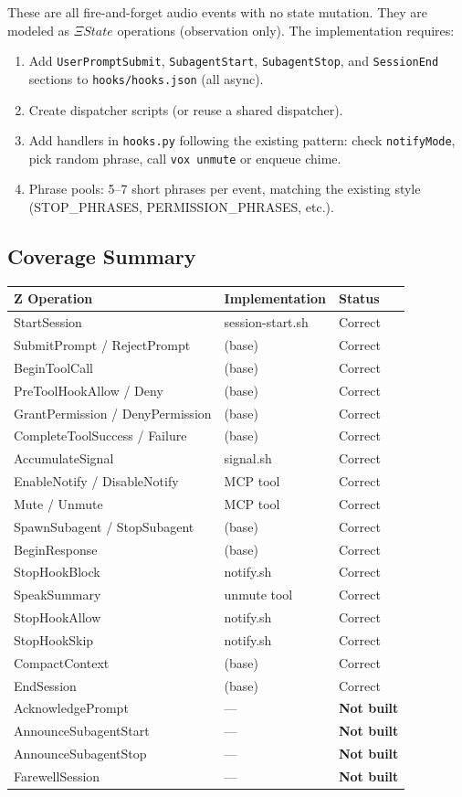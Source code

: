 \documentclass[a4paper,10pt,fleqn]{article}
\begin{document}
These are all fire-and-forget audio events with no state mutation.
They are modeled as $\Xi State$ operations (observation only). The
implementation requires:

\begin{enumerate}
  \item Add \texttt{UserPromptSubmit}, \texttt{SubagentStart},
    \texttt{SubagentStop}, and \texttt{SessionEnd} sections to
    \texttt{hooks/hooks.json} (all async).
  \item Create dispatcher scripts (or reuse a shared dispatcher).
  \item Add handlers in \texttt{hooks.py} following the existing
    pattern: check \texttt{notifyMode}, pick random phrase, call
    \texttt{vox unmute} or enqueue chime.
  \item Phrase pools: 5--7 short phrases per event, matching the
    existing style (STOP\_PHRASES, PERMISSION\_PHRASES, etc.).
\end{enumerate}

\subsection{Coverage Summary}

\begin{tabular}{lll}
\hline
\textbf{Z Operation} & \textbf{Implementation} & \textbf{Status} \\
\hline
StartSession & session-start.sh & Correct \\
SubmitPrompt / RejectPrompt & (base) & Correct \\
BeginToolCall & (base) & Correct \\
PreToolHookAllow / Deny & (base) & Correct \\
GrantPermission / DenyPermission & (base) & Correct \\
CompleteToolSuccess / Failure & (base) & Correct \\
AccumulateSignal & signal.sh & Correct \\
EnableNotify / DisableNotify & MCP tool & Correct \\
Mute / Unmute & MCP tool & Correct \\
SpawnSubagent / StopSubagent & (base) & Correct \\
BeginResponse & (base) & Correct \\
StopHookBlock & notify.sh & Correct \\
SpeakSummary & unmute tool & Correct \\
StopHookAllow & notify.sh & Correct \\
StopHookSkip & notify.sh & Correct \\
CompactContext & (base) & Correct \\
EndSession & (base) & Correct \\
AcknowledgePrompt & --- & \textbf{Not built} \\
AnnounceSubagentStart & --- & \textbf{Not built} \\
AnnounceSubagentStop & --- & \textbf{Not built} \\
FarewellSession & --- & \textbf{Not built} \\
\hline
\end{tabular}
\end{document}
